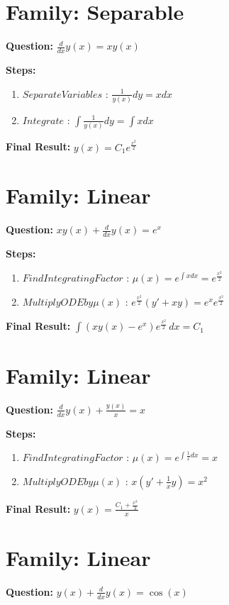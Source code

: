 \documentclass{article}
\begin{document}
\section*{Family: Separable}
\textbf{Question:} $\frac{d}{d x} y{\left(x \right)} = x y{\left(x \right)}$

\textbf{Steps:}
\begin{enumerate}
\item $Separate Variables$ :  $\frac{1}{y{\left(x \right)}} dy = x dx$
\item $Integrate$ :  $\int \frac{1}{y{\left(x \right)}} dy = \int x dx$
\end{enumerate}
\textbf{Final Result:} $y{\left(x \right)} = C_{1} e^{\frac{x^{2}}{2}}$

\section*{Family: Linear}
\textbf{Question:} $x y{\left(x \right)} + \frac{d}{d x} y{\left(x \right)} = e^{x}$

\textbf{Steps:}
\begin{enumerate}
\item $Find Integrating Factor$ :  $\mu(x) = e^{\int x dx} = e^{\frac{x^{2}}{2}}$
\item $Multiply ODE by \mu(x)$ :  $e^{\frac{x^{2}}{2}}(y' + xy) = e^{x} e^{\frac{x^{2}}{2}}$
\end{enumerate}
\textbf{Final Result:} $\int \left(x y{\left(x \right)} - e^{x}\right) e^{\frac{x^{2}}{2}}\, dx = C_{1}$

\section*{Family: Linear}
\textbf{Question:} $\frac{d}{d x} y{\left(x \right)} + \frac{y{\left(x \right)}}{x} = x$

\textbf{Steps:}
\begin{enumerate}
\item $Find Integrating Factor$ :  $\mu(x) = e^{\int \frac{1}{x} dx} = x$
\item $Multiply ODE by \mu(x)$ :  $x(y' + \frac{1}{x}y) = x^{2}$
\end{enumerate}
\textbf{Final Result:} $y{\left(x \right)} = \frac{C_{1} + \frac{x^{3}}{3}}{x}$

\section*{Family: Linear}
\textbf{Question:} $y{\left(x \right)} + \frac{d}{d x} y{\left(x \right)} = \cos{\left(x \right)}$
\end{document}
